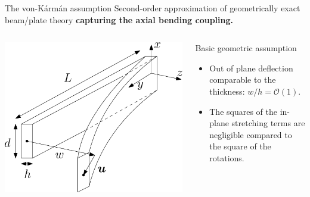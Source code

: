 \documentclass[aspectratio=169]{beamer}
\begin{document}
\begin{frame}{The von-K\'arm\'an assumption}
Second-order approximation of geometrically exact beam/plate theory \textbf{capturing the axial bending coupling.}	

\begin{columns}
	\begin{column}{.5\textwidth}
	\includegraphics[width=.9\textwidth]{beam_deflected.eps}
	\end{column}
	\begin{column}{.5\textwidth}
	
	\begin{block}{Basic geometric assumption}
		\begin{itemize}
		\item Out of plane deflection comparable to the thickness: $w/h = \mathcal{O}(1)$.
		\item The squares of the in-plane stretching terms are negligible compared to the square of the rotations.
		\end{itemize}
		
	\end{block}
	
	\end{column}
\end{columns}

\end{frame}
\end{document}
